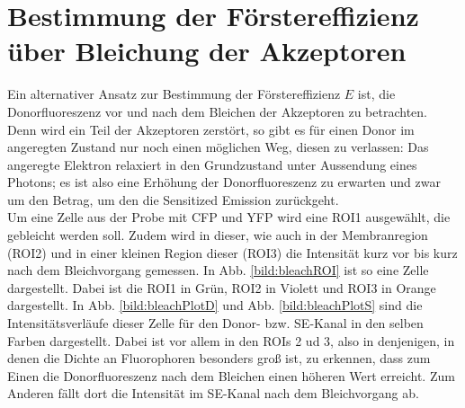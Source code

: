 

\section{Bestimmung der Förstereffizienz über Bleichung der Akzeptoren}

Ein alternativer Ansatz zur Bestimmung der Förstereffizienz $E$ ist, die Donorfluoreszenz vor und nach dem Bleichen der Akzeptoren zu betrachten. Denn wird ein 
Teil der Akzeptoren zerstört, so gibt es für einen Donor im angeregten Zustand nur noch einen möglichen Weg, diesen zu verlassen: Das angeregte Elektron relaxiert in den 
Grundzustand unter Aussendung eines Photons; es ist also eine Erhöhung der Donorfluoreszenz zu erwarten und zwar um den Betrag, um den die Sensitized Emission zurückgeht. \\
Um eine Zelle aus der Probe mit CFP und YFP wird eine ROI1 ausgewählt, die gebleicht werden soll. 
Zudem wird in dieser, wie auch in der Membranregion (ROI2) und in einer kleinen Region dieser (ROI3) die Intensität kurz vor bis kurz nach dem Bleichvorgang gemessen. 
In Abb. \ref{bild:bleachROI} ist so eine Zelle dargestellt. Dabei ist die ROI1 in Grün, ROI2 in Violett und ROI3 in Orange dargestellt. In Abb. \ref{bild:bleachPlotD} 
und Abb. \ref{bild:bleachPlotS} sind die Intensitätsverläufe dieser Zelle für den Donor- bzw. SE-Kanal in den selben Farben dargestellt. 
Dabei ist vor allem in den ROIs 2 ud 3, also in denjenigen, in denen die Dichte an Fluorophoren besonders groß ist, zu erkennen, dass zum 
Einen die Donorfluoreszenz nach dem Bleichen einen höheren Wert erreicht. Zum Anderen fällt dort die Intensität im SE-Kanal nach dem 
Bleichvorgang ab.


